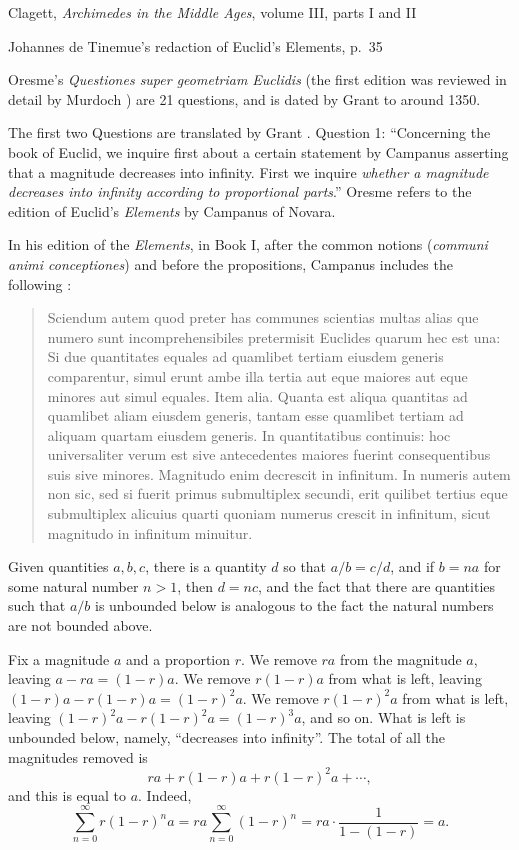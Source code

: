 \documentclass{amsart}
\theoremstyle{definition}
\begin{document}
Clagett, {\em Archimedes in the Middle Ages}, volume III, parts I and II

Johannes de Tinemue's redaction of Euclid's Elements, p.~35



Oresme's {\em Questiones super geometriam Euclidis} \cite{busard2010} (the first edition was reviewed in detail by Murdoch \cite[p.~69]{murdoch1964}) are 21 questions, and is dated by Grant to around 1350. 





The first two Questions are translated by Grant \cite[pp.~131--135]{grant1974}. Question 1:
``Concerning the book of Euclid, we inquire first about a certain statement by Campanus asserting that a magnitude decreases into infinity. First we inquire {\em whether a magnitude
decreases into infinity according to  proportional parts}.'' Oresme refers to the edition of Euclid's {\em Elements} by Campanus of Novara.

In his edition of the {\em Elements}, in Book I, after the common notions ({\em communi animi conceptiones})
and before the propositions, Campanus includes the following \cite[pp.~58--59]{campanus}:

\begin{quote}
Sciendum autem quod preter has communes scientias multas alias que numero sunt incomprehensibiles pretermisit Euclides
quarum hec est una: Si due quantitates equales ad quamlibet tertiam eiusdem generis comparentur, simul erunt ambe illa tertia aut eque maiores
aut eque minores aut simul equales. Item alia. Quanta est aliqua quantitas ad quamlibet aliam eiusdem generis,
tantam esse quamlibet tertiam ad aliquam quartam eiusdem generis. In quantitatibus continuis: hoc universaliter verum
est sive antecedentes maiores fuerint consequentibus suis sive minores. Magnitudo enim decrescit in infinitum. In numeris autem non sic,
sed si fuerit primus submultiplex secundi, erit quilibet tertius eque submultiplex alicuius quarti quoniam numerus crescit in infinitum, sicut magnitudo
in infinitum minuitur.
\end{quote}


Given quantities $a,b,c$, there is a quantity $d$ so that $a/b=c/d$, and if $b=na$ for some natural number $n>1$, then 
$d=nc$, and the fact that there are quantities such that $a/b$ is unbounded below is analogous to the fact the natural numbers are not bounded
above. 

Fix a magnitude $a$ and a proportion $r$. We remove $ra$ from the  magnitude $a$, leaving $a-ra=(1-r)a$. We remove $r(1-r)a$ from what is left,
leaving $(1-r)a-r(1-r)a=(1-r)^2a$. We remove $r(1-r)^2a$ from what is left, leaving $(1-r)^2a - r(1-r)^2a=(1-r)^3a$, and so on. What is left is unbounded below,
namely, ``decreases into infinity''. The total of all the magnitudes removed is
\[
ra+r(1-r)a + r(1-r)^2a + \cdots,
\]
and this is equal to $a$. Indeed,
\[
\sum_{n=0}^\infty r(1-r)^n a = ra \sum_{n=0}^\infty (1-r)^n = ra \cdot \frac{1}{1-(1-r)} = a.
\]
\end{document}
